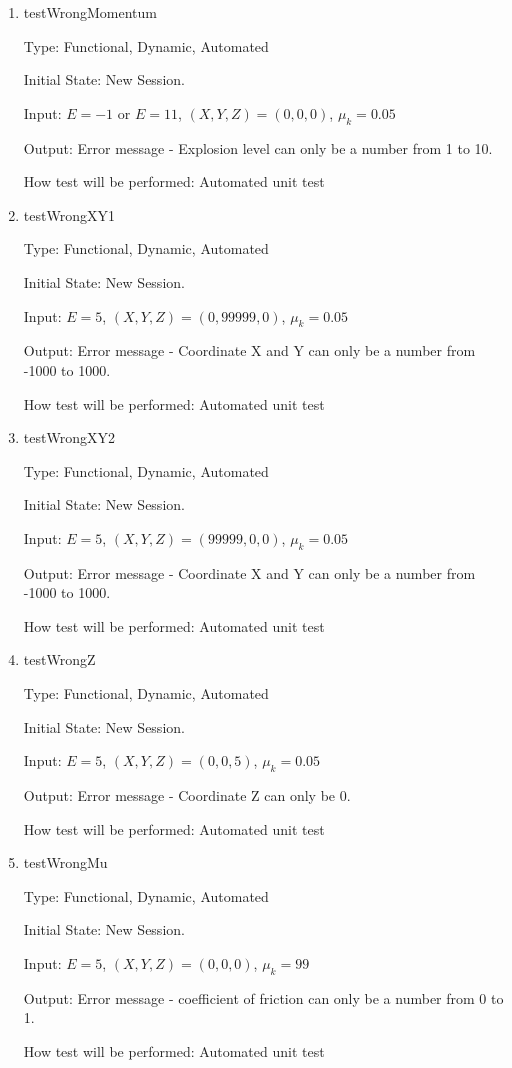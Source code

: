 \documentclass[12pt, titlepage]{article}
\begin{document}
\begin{enumerate}

\item{testWrongMomentum\\}

Type: Functional, Dynamic, Automated

Initial State: New Session.

Input: $E = -1$ or $E = 11$, $(X,Y,Z) = (0,0,0)$, $\mu_{k} = 0.05$  

Output: Error message - Explosion level can only be a number from 1 to 10.

How test will be performed: Automated unit test

\item{testWrongXY1\\}

Type: Functional, Dynamic, Automated

Initial State: New Session.

Input: $E = 5$, $(X,Y,Z) = (0,99999,0)$, $\mu_{k} = 0.05$  

Output: Error message - Coordinate X and Y can only be a number from -1000 to 1000.

How test will be performed: Automated unit test

\item{testWrongXY2\\}

Type: Functional, Dynamic, Automated

Initial State: New Session.

Input: $E = 5$, $(X,Y,Z) = (99999,0,0)$, $\mu_{k} = 0.05$  

Output: Error message - Coordinate X and Y can only be a number from -1000 to 1000.

How test will be performed: Automated unit test

\item{testWrongZ\\}

Type: Functional, Dynamic, Automated

Initial State: New Session.

Input: $E = 5$, $(X,Y,Z) = (0,0,5)$, $\mu_{k} = 0.05$  

Output: Error message - Coordinate Z can only be 0.

How test will be performed: Automated unit test

\item{testWrongMu\\}

Type: Functional, Dynamic, Automated

Initial State: New Session.

Input: $E = 5$, $(X,Y,Z) = (0,0,0)$, $\mu_{k} = 99$  

Output: Error message - coefficient of friction can only be a number from 0 to 1.

How test will be performed: Automated unit test 

\end{enumerate}
\end{document}
